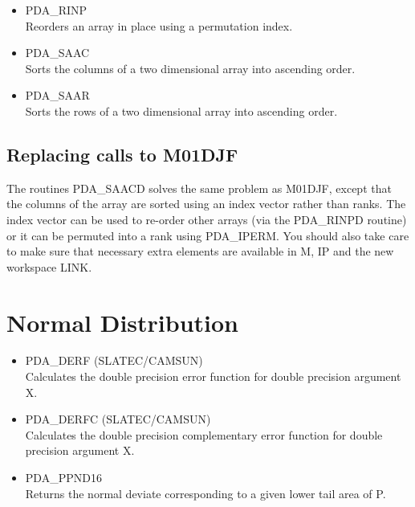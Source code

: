 \documentclass[11pt,twoside]{article}
\newcommand{\htmlref}[2]{#1}
\newcommand{\xlabel}[1]{}
\begin{document}
\begin{itemize}
\item \htmlref{PDA\_RINP}{PDA\_RINP}\\
   Reorders an array in place using a permutation index.

\item \htmlref{PDA\_SAAC}{PDA\_SAAC}\\
   Sorts the columns of a two dimensional array into ascending order.

\item \htmlref{PDA\_SAAR}{PDA\_SAAR}\\
   Sorts the rows of a two dimensional array into ascending order.

\end{itemize}

\subsection{\xlabel{replacing_calls_to_m01djf}Replacing calls to M01DJF}

The routines PDA\_SAACD solves the same problem as M01DJF, except that
the columns of the array are sorted using an index vector rather than
ranks. The index vector can be used to re-order other arrays (via the
PDA\_RINPD routine) or it can be permuted into a rank using PDA\_IPERM.
You should also take care to make sure that necessary extra elements
are available in M, IP and the new workspace LINK.


\section{\xlabel{normal_distribution}Normal Distribution}

\begin{itemize}

\item \htmlref{PDA\_DERF}{PDA\_DERF} (SLATEC/CAMSUN)\\
   Calculates the double precision error function for double
   precision argument X.
\item \htmlref{PDA\_DERFC}{PDA\_DERFC} (SLATEC/CAMSUN)\\
   Calculates the double precision complementary error function
   for double precision argument X.
\item \htmlref{PDA\_PPND16}{PDA\_PPND16} \\
   Returns the normal deviate corresponding to a given lower
   tail area of P.
\end{itemize}
\end{document}
